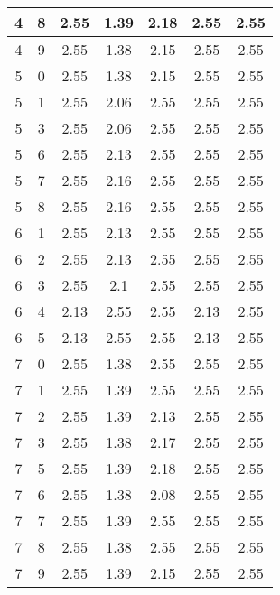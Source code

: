 \begin{longtable}{|c|c||c||c|c||c|c|}
	4 & 8 & 2.55 & 1.39 & 2.18 & 2.55 & 2.55 \\ \hline
	4 & 9 & 2.55 & 1.38 & 2.15 & 2.55 & 2.55 \\ \hline
	5 & 0 & 2.55 & 1.38 & 2.15 & 2.55 & 2.55 \\ \hline
	5 & 1 & 2.55 & 2.06 & 2.55 & 2.55 & 2.55 \\ \hline
	5 & 3 & 2.55 & 2.06 & 2.55 & 2.55 & 2.55 \\ \hline
	5 & 6 & 2.55 & 2.13 & 2.55 & 2.55 & 2.55 \\ \hline
	5 & 7 & 2.55 & 2.16 & 2.55 & 2.55 & 2.55 \\ \hline
	5 & 8 & 2.55 & 2.16 & 2.55 & 2.55 & 2.55 \\ \hline
	6 & 1 & 2.55 & 2.13 & 2.55 & 2.55 & 2.55 \\ \hline
	6 & 2 & 2.55 & 2.13 & 2.55 & 2.55 & 2.55 \\ \hline
	6 & 3 & 2.55 & 2.1 & 2.55 & 2.55 & 2.55 \\ \hline
	6 & 4 & 2.13 & 2.55 & 2.55 & 2.13 & 2.55 \\ \hline
	6 & 5 & 2.13 & 2.55 & 2.55 & 2.13 & 2.55 \\ \hline
	7 & 0 & 2.55 & 1.38 & 2.55 & 2.55 & 2.55 \\ \hline
	7 & 1 & 2.55 & 1.39 & 2.55 & 2.55 & 2.55 \\ \hline
	7 & 2 & 2.55 & 1.39 & 2.13 & 2.55 & 2.55 \\ \hline
	7 & 3 & 2.55 & 1.38 & 2.17 & 2.55 & 2.55 \\ \hline
	7 & 5 & 2.55 & 1.39 & 2.18 & 2.55 & 2.55 \\ \hline
	7 & 6 & 2.55 & 1.38 & 2.08 & 2.55 & 2.55 \\ \hline
	7 & 7 & 2.55 & 1.39 & 2.55 & 2.55 & 2.55 \\ \hline
	7 & 8 & 2.55 & 1.38 & 2.55 & 2.55 & 2.55 \\ \hline
	7 & 9 & 2.55 & 1.39 & 2.15 & 2.55 & 2.55 \\ \hline
\end{longtable}
\clearpage{}
